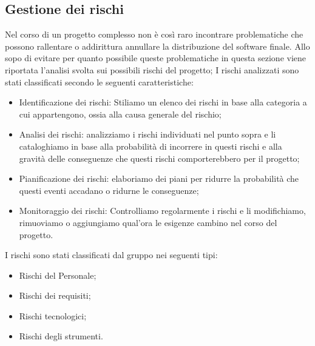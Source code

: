 \documentclass[../piano-di-progetto.tex]{subfiles}
\begin{document}
	\subsection{Gestione dei rischi}%
  \label{sub:gestione_dei_rischi}
  Nel corso di un progetto complesso non è così raro incontrare problematiche che possono rallentare o addirittura annullare la distribuzione del software finale.
  Allo sopo di evitare per quanto possibile queste problematiche in questa sezione viene riportata l'analisi svolta sui possibili rischi del progetto; I rischi analizzati sono stati classificati secondo le seguenti caratteristiche:
  \begin{itemize}
      \item Identificazione dei rischi: Stiliamo un elenco dei rischi in base alla categoria a cui appartengono, ossia alla causa generale del rischio;
      \item Analisi dei rischi: analizziamo i rischi individuati nel punto sopra e li cataloghiamo in base alla probabilità di incorrere in questi rischi e alla gravità delle conseguenze che questi rischi comporterebbero per il progetto;
      \item Pianificazione dei rischi: elaboriamo dei piani per ridurre la probabilità che questi eventi accadano o ridurne le conseguenze;
      \item Monitoraggio dei rischi: Controlliamo regolarmente i rischi e li modifichiamo, rimuoviamo o aggiungiamo qual'ora le esigenze cambino nel corso del progetto.
    \end{itemize}
    I rischi sono stati classificati dal gruppo nei seguenti tipi:
    \begin{itemize}
      \item Rischi del Personale;
      \item Rischi dei requisiti;
      \item Rischi tecnologici;
      \item Rischi degli strumenti.
    \end{itemize}
\end{document}
